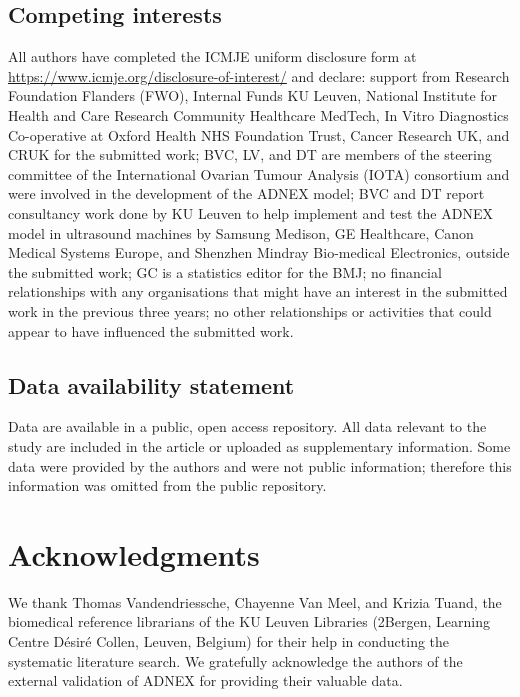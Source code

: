 \subsection*{Competing interests}
All authors have completed the ICMJE uniform disclosure form at \url{https://www.icmje.org/disclosure-of-interest/} and declare: support from Research Foundation Flanders (FWO), Internal Funds KU Leuven, National Institute for Health and Care Research Community Healthcare MedTech, In Vitro Diagnostics Co-operative at Oxford Health NHS Foundation Trust, Cancer Research UK, and CRUK for the submitted work; BVC, LV, and DT are members of the steering committee of the International Ovarian Tumour Analysis (IOTA) consortium and were involved in the development of the ADNEX model; BVC and DT report consultancy work done by KU Leuven to help implement and test the ADNEX model in ultrasound machines by Samsung Medison, GE Healthcare, Canon Medical Systems Europe, and Shenzhen Mindray Bio-medical Electronics, outside the submitted work; GC is a statistics editor for the BMJ; no financial relationships with any organisations that might have an interest in the submitted work in the previous three years; no other relationships or activities that could appear to have influenced the submitted work.


\subsection*{Data availability statement}
Data are available in a public, open access repository. All data relevant to the study are included in the article or uploaded as supplementary information. Some data were provided by the authors and were not public information; therefore this information was omitted from the public repository.

\section*{Acknowledgments}

We thank Thomas Vandendriessche, Chayenne Van Meel, and Krizia Tuand, the biomedical reference librarians of the KU Leuven Libraries (2Bergen, Learning Centre Désiré Collen, Leuven, Belgium) for their help in conducting the systematic literature search. We gratefully acknowledge the authors of the external validation of ADNEX for providing their valuable data.

